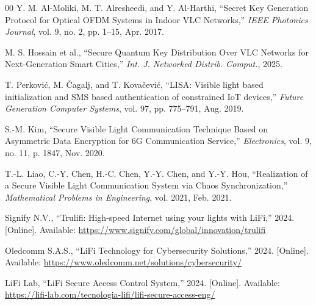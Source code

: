 \documentclass[conference]{IEEEtran}
\begin{document}
\begin{thebibliography}{00}
Y. M. Al-Moliki, M. T. Alresheedi, and Y. Al-Harthi, ``Secret Key Generation Protocol for Optical OFDM Systems in Indoor VLC Networks,'' \textit{IEEE Photonics Journal}, vol. 9, no. 2, pp. 1--15, Apr. 2017.

M. S. Hossain et al., ``Secure Quantum Key Distribution Over VLC Networks for Next-Generation Smart Cities,'' \textit{Int. J. Networked Distrib. Comput.}, 2025.

T. Perkovi\'{c}, M. \v{C}agalj, and T. Kova\v{c}evi\'{c}, ``LISA: Visible light based initialization and SMS based authentication of constrained IoT devices,'' \textit{Future Generation Computer Systems}, vol. 97, pp. 775--791, Aug. 2019.

S.-M. Kim, ``Secure Visible Light Communication Technique Based on Asymmetric Data Encryption for 6G Communication Service,'' \textit{Electronics}, vol. 9, no. 11, p. 1847, Nov. 2020.

T.-L. Liao, C.-Y. Chen, H.-C. Chen, Y.-Y. Chen, and Y.-Y. Hou, ``Realization of a Secure Visible Light Communication System via Chaos Synchronization,'' \textit{Mathematical Problems in Engineering}, vol. 2021, Feb. 2021.

Signify N.V., ``Trulifi: High-speed Internet using your lights with LiFi,'' 2024. [Online]. Available: \url{https://www.signify.com/global/innovation/trulifi}

Oledcomm S.A.S., ``LiFi Technology for Cybersecurity Solutions,'' 2024. [Online]. Available: \url{https://www.oledcomm.net/solutions/cybersecurity/}

LiFi Lab, ``LiFi Secure Access Control System,'' 2024. [Online]. Available: \url{https://lifi-lab.com/tecnologia-lifi/lifi-secure-access-eng/}

\end{thebibliography}
\end{document}

